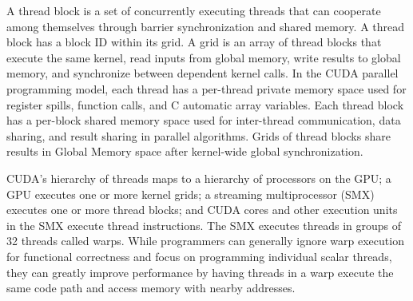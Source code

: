 A thread block is a set of concurrently executing threads that can cooperate among themselves through barrier synchronization and shared memory. A thread block has a block ID within its grid. A grid is an array of thread blocks that execute the same kernel, read inputs from global memory, write results to global memory, and synchronize between dependent kernel calls. In the CUDA parallel programming model, each thread has a per-thread private memory space used for register spills, function calls, and C automatic array variables. Each thread block has a per-block shared memory space used for inter-thread communication, data sharing, and result sharing in parallel algorithms. Grids of thread blocks share results in Global Memory space after kernel-wide global synchronization.

CUDA's hierarchy of threads maps to a hierarchy of processors on the GPU; a GPU executes one or more kernel grids; a streaming multiprocessor (SMX) executes one or more thread blocks; and CUDA cores and other execution units in the SMX execute thread instructions. The SMX executes threads in groups of 32 threads called warps. While programmers can generally ignore warp execution for functional correctness and focus on programming individual scalar threads, they can greatly improve performance by having threads in a warp execute the same code path and access memory with nearby addresses.

